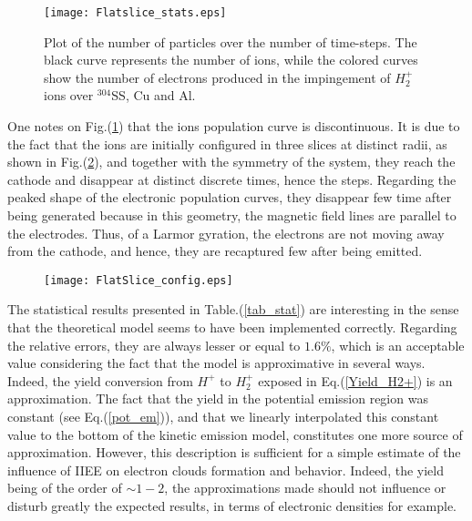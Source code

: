 \begin{figure}[h!]
\centering
	\texttt{[image: Flatslice\_stats.eps]}
	\caption{\label{flat_slice} Plot of the number of particles over the number of time-steps. The black curve represents the number of ions, while the colored curves show the number of electrons produced in the impingement of $H_2^+$ ions over $^{304}$SS, Cu and Al.}
\end{figure}  

\noindent One notes on Fig.(\ref{flat_slice}) that the ions population curve is discontinuous. It is due to the fact that the ions are initially configured in three slices at distinct radii, as shown in Fig.(\ref{slice_config}), and together with the symmetry of the system, they reach the cathode and disappear at distinct discrete times, hence the steps. Regarding the peaked shape of the electronic population curves, they disappear few time after being generated because in this geometry, the magnetic field lines are parallel to the electrodes. Thus, of a Larmor gyration, the electrons are not moving away from the cathode, and hence, they are recaptured few after being emitted.\\

\begin{figure}[h!]
\centering
	\texttt{[image: FlatSlice\_config.eps]}
	\caption{\label{slice_config}  }
\end{figure}  

The statistical results presented in Table.(\ref{tab_stat}) are interesting in the sense that the theoretical model seems to have been implemented correctly. Regarding the relative errors, they are always lesser or equal to $1.6\%$, which is an acceptable value considering the fact that the model is approximative in several ways. Indeed, the yield conversion from $H^+$ to $H_2^{+}$ exposed in Eq.(\ref{Yield_H2+}) is an approximation. The fact that the yield in the potential emission region was constant (see Eq.(\ref{pot_em})), and that we linearly interpolated this constant value to the bottom of the kinetic emission model, constitutes one more source of approximation. However, this description is sufficient for a simple estimate of the influence of IIEE on electron clouds formation and behavior. Indeed, the yield being of the order of $\sim 1-2$, the approximations made should not influence or disturb greatly the expected results, in terms of electronic densities for example. \\


